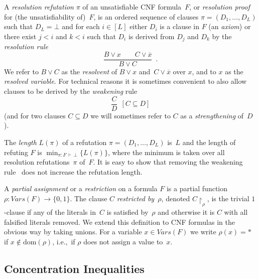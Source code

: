 \documentclass{article}
\newcommand{\set}[1]{\{ #1 \}}
\newcommand{\olnot}[1]{\overline{#1}}
\newcommand{\introduceterm}[1]{{\emph{#1}}}
\newcommand{\eqperiod}{\enspace .}
\newcommand{\ie}{i.e.,\ }
\newcommand{\proofstd}{\pi}
\newcommand{\derives}{\vdash}
\newcommand{\derivof}[4][\derives]
        {{\ensuremath{{#2} : {#3} \, {#1}\, {#4}}}}
\newcommand{\refof}[2]{\derivof{#1}{#2}{\bot}}
\newcommand{\emptycl}{\bot}
\newcommand{\formf}{\ensuremath{F}}
\newcommand{\clb}{\ensuremath{B}}
\newcommand{\clc}{\ensuremath{C}}
\newcommand{\cld}{\ensuremath{D}}
\newcommand{\setsofvarsorlit}[2]{\mathit{#1}({#2})}
\newcommand{\vars}[1]{\setsofvarsorlit{Vars}{#1}}
\newcommand{\restrict}[2]{{{#1}\!\!\upharpoonright_{#2}}}
\newcommand{\genericformsmall}[2]{\mathit{#1}( #2 )}
\newcommand{\length}[1]{\genericformsmall{L}{#1}}
\newcommand{\dom}[1]{\mathrm{dom} ( #1 )}
\newcommand{\lengthsize}{length\xspace}
\numberwithin{equation}{section}
\begin{document}
A \introduceterm{resolution  refutation} $\proofstd$ of an unsatisfiable CNF formula~$\formf$,
or
\introduceterm{resolution proof} for (the unsatisfiability
of)~$\formf$, 
is an ordered sequence of clauses
\mbox{$\proofstd = (\cld_1, \dotsc, \cld_{L})$}
such that $\cld_{L} = \emptycl$ and
for each $i \in [L]$
either 
$\cld_i$ is a clause in $\formf$
(an \introduceterm{axiom})
or there exist $j < i$ and $k < i$ such that
$\cld_i$ is derived from $\cld_j$ and $\cld_k$
by the
\introduceterm{resolution rule}
\begin{equation}
\label{eq:resolution-rule}
\ensuremath{\dfrac{\clb \lor x\qquad\clc \lor \olnot{x}}{\clb \lor \clc}}
\eqperiod
\end{equation}
We refer to $\clb \lor \clc$ as the \introduceterm{resolvent} of $\clb
\lor x$ and~$\clc \lor \olnot{x}$ over $x$, and to $x$ as the
\emph{resolved variable}. 
For technical reasons it is 
sometimes convenient to also allow
clauses to be derived 
by the \introduceterm{weakening} rule
\begin{equation}
\label{eq:weakening}
\ensuremath{\dfrac{\clc}{\cld}}
\ \ [ \clc \subseteq \cld ]
\end{equation}
(and for two clauses 
$\clc \subseteq \cld$
we will sometimes refer to $\clc$
as a \introduceterm{strengthening} of~$\cld$).

The \introduceterm{\lengthsize}
$\length{\proofstd}$   
of a refutation $\proofstd = (\cld_1, \dotsc, \cld_{L})$
is~$L$ and the length of refuting 
$\formf$ is
$\min_{\refof{\proofstd}{\formf}}\set{\length{\proofstd}}$, 
where the minimum is taken over all resolution refutations~$\proofstd$
of~$\formf$.
It is easy to show that
removing the weakening rule~
does not increase the refutation length.

A \introduceterm{partial assignment} or a \introduceterm{restriction} on a 
formula $\formf$ is a partial function $\rho : \vars{F} \rightarrow \set{0,1}$. 
The clause $C$
\introduceterm{restricted by~$\rho$}, denoted $\restrict{C}{\rho}$, is
the trivial $1$-clause if any of the literals in~$C$ is satisfied by~$\rho$
and otherwise it is $C$ with all falsified literals removed. We extend
this definition  
to CNF formulas in the obvious way by taking unions.
For a variable $x\in \vars{F}$ we 
write
$\rho(x)=*$ if $x\notin \dom{\rho}$,
\ie if $\rho$ does not assign a value to~$x$.

\subsection{Concentration Inequalities}
\end{document}
